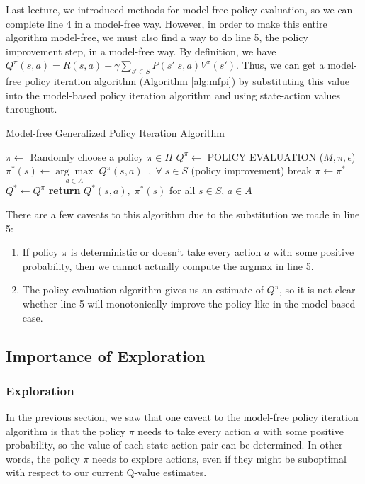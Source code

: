 \documentclass{article}
\theoremstyle{definition}
\theoremstyle{remark}
\begin{document}
Last lecture, we introduced methods for model-free policy evaluation, so we can complete line 4 in a model-free way.  However, in order to make this entire algorithm model-free, we must also find a way to do line 5, the policy improvement step, in a model-free way.  By definition, we have $Q^\pi(s,a) = R(s,a) + \gamma \sum_{s' \in S} P(s'|s,a) V^{\pi}(s')$.  Thus, we can get a model-free policy iteration algorithm (Algorithm \ref{alg:mfpi}) by substituting this value into the model-based policy iteration algorithm and using state-action values throughout.

\begin{algorithm}
\caption{Model-free Generalized Policy Iteration Algorithm}\label{alg:mfpi}
\begin{algorithmic}[1]
\State $\pi \gets $ Randomly choose a policy $\pi \in \Pi$
\State $Q^{\pi} \gets$ \small POLICY EVALUATION \normalsize ($M,\pi,\epsilon$)
\State $\pi^{\ast}(s) \gets \underset{a \in A}{\arg\max} \; Q^\pi(s,a)  \;\;,\; \forall \; s \in S$ (policy improvement)
\State break
\Else
\State $\pi \gets \pi^{\ast}$
\EndIf
\EndWhile
\label{mdp4label}
\State $Q^{\ast} \gets Q^{\pi}$
\State \textbf{return} $Q^{\ast}(s,a), \; \pi^{\ast}(s)$ for all $s \in S$, $a \in A$
\EndProcedure
\end{algorithmic}
\end{algorithm}

There are a few caveats to this algorithm due to the substitution we made in line 5:
\begin{enumerate}[noitemsep,partopsep=0pt,topsep=0pt,parsep=0pt]
	\item If policy $\pi$ is deterministic or doesn't take every action $a$ with some positive probability, then we cannot actually compute the argmax in line 5.
	\item The policy evaluation algorithm gives us an estimate of $Q^\pi$, so it is not clear whether line 5 will monotonically improve the policy like in the model-based case.
\end{enumerate}


\subsection{Importance of Exploration}
\subsubsection{Exploration}
In the previous section, we saw that one caveat to the model-free policy iteration algorithm is that the policy $\pi$ needs to take every action $a$ with some positive probability, so the value of each state-action pair can be determined.  In other words, the policy $\pi$ needs to explore actions, even if they might be suboptimal with respect to our current Q-value estimates.
\end{document}
